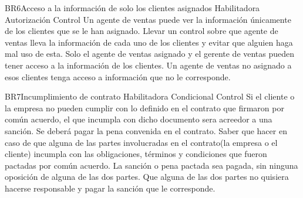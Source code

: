 \hypertarget{BR:BR6}{}
\begin{BussinesRule}{BR6}{Acceso a la información de solo los clientes asignados}
    \BRitem[Tipo: ] Habilitadora
    \BRitem[Clase:] Autorización
    \BRitem[Nivel:] Control
    \BRitem[Descripción:] Un agente de ventas puede ver la información únicamente de los clientes que se le han asignado.
    \BRitem[Motivación:]Llevar un control sobre que agente de ventas lleva la información de cada uno de los clientes y evitar que alguien haga mal uso de esta.
     Solo el agente de ventas asignado y el gerente de ventas pueden tener acceso a la información de los clientes. 
     Un agente de ventas no asignado a esos clientes tenga acceso a información que no le corresponde. 
\end{BussinesRule}

\hypertarget{BR:BR7}{}
\begin{BussinesRule}{BR7}{Incumplimiento de contrato}
    \BRitem[Tipo: ] Habilitadora
    \BRitem[Clase:] Condicional
    \BRitem[Nivel:] Control
    \BRitem[Descripción:] Si el cliente o la empresa no pueden cumplir con lo definido en el contrato que firmaron por común acuerdo, el que incumpla con dicho documento sera acreedor a una sanción. Se deberá pagar la pena convenida en el contrato.
    \BRitem[Motivación: ] Saber que hacer en caso de que alguna de las partes involucradas en el contrato(la empresa o el cliente) incumpla con las obligaciones, términos y condiciones que fueron pactadas por común acuerdo.
     La sanción o pena pactada sea pagada, sin ninguna oposición de alguna de las dos partes. 
     Que alguna de las dos partes no quisiera hacerse responsable y pagar la sanción que le corresponde.
\end{BussinesRule}

